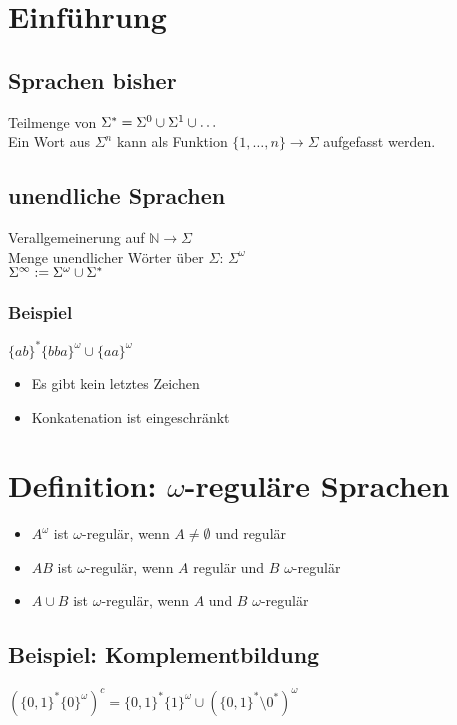 \section{Einführung}
    \subsection{Sprachen bisher}
        Teilmenge von $\Sigma^*=\Sigma^0\cup\Sigma^1\cup\dots$\\
        Ein Wort aus $\Sigma^n$ kann als Funktion $\{1,\dots,n\}\rightarrow\Sigma$ aufgefasst werden.\\
    \subsection{unendliche Sprachen}
        Verallgemeinerung auf $\mathds{N}\rightarrow\Sigma$\\
        Menge unendlicher Wörter über $\Sigma$: $\Sigma^\omega$\\
        $\Sigma^\infty:=\Sigma^\omega\cup\Sigma^*$
        \subsubsection{Beispiel}
            $\{ab\}^*\{bba\}^\omega\cup\{aa\}^\omega$
            \begin{itemize}
                \item Es gibt kein letztes Zeichen
                \item Konkatenation ist eingeschränkt
            \end{itemize}
\section{Definition: $\omega$-reguläre Sprachen}
    \begin{itemize}
        \item $A^\omega$ ist $\omega$-regulär, wenn $A\not=\emptyset$ und regulär
        \item $AB$ ist $\omega$-regulär, wenn $A$ regulär und $B$ $\omega$-regulär
        \item $A\cup B$ ist $\omega$-regulär, wenn $A$ und $B$ $\omega$-regulär
    \end{itemize}
    \subsection{Beispiel: Komplementbildung}
        $\left(\{0,1\}^*\{0\}^\omega\right)^c=\{0,1\}^*\{1\}^\omega\cup\left(\{0,1\}^*\setminus0^*\right)^\omega$

